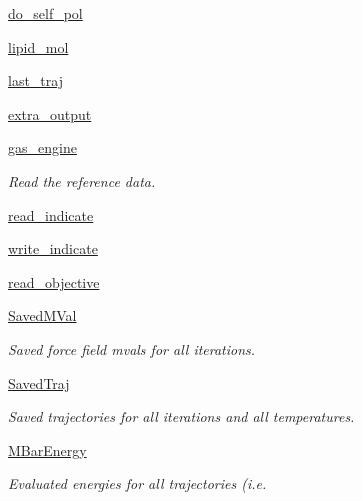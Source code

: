 \begin{DoxyCompactItemize}
\item 
\hyperlink{classforcebalance_1_1lipid_1_1Lipid_a20b017fb691f904bd18bd7d9ff1c91fc}{do\-\_\-self\-\_\-pol}
\item 
\hyperlink{classforcebalance_1_1lipid_1_1Lipid_a1e5ac68a7b79b3481acb17ed86db8aa1}{lipid\-\_\-mol}
\item 
\hyperlink{classforcebalance_1_1lipid_1_1Lipid_aeb05bd9b9da9b19c57e40a9675409731}{last\-\_\-traj}
\item 
\hyperlink{classforcebalance_1_1lipid_1_1Lipid_aedfd8a447f46dc6c2072ad50f4537cf7}{extra\-\_\-output}
\item 
\hyperlink{classforcebalance_1_1lipid_1_1Lipid_ad64df596db06f1dbdf49e0acca65534f}{gas\-\_\-engine}
\begin{DoxyCompactList}\small\item\em Read the reference data. \end{DoxyCompactList}\item 
\hyperlink{classforcebalance_1_1lipid_1_1Lipid_af5dfb680e8dc79f92c8e882f72f15559}{read\-\_\-indicate}
\item 
\hyperlink{classforcebalance_1_1lipid_1_1Lipid_abd1d6916a71c0529ad86dffd5d1f033c}{write\-\_\-indicate}
\item 
\hyperlink{classforcebalance_1_1lipid_1_1Lipid_a0edba63f8f5fbc3f8c51df153a886db9}{read\-\_\-objective}
\item 
\hyperlink{classforcebalance_1_1lipid_1_1Lipid_a07e86c96c0045df320ffde881315fec3}{Saved\-M\-Val}
\begin{DoxyCompactList}\small\item\em Saved force field mvals for all iterations. \end{DoxyCompactList}\item 
\hyperlink{classforcebalance_1_1lipid_1_1Lipid_a49bef67b40e46c5df608c00d2519b111}{Saved\-Traj}
\begin{DoxyCompactList}\small\item\em Saved trajectories for all iterations and all temperatures. \end{DoxyCompactList}\item 
\hyperlink{classforcebalance_1_1lipid_1_1Lipid_aa41ccbc13f7ca3f0700b825a9e51a24a}{M\-Bar\-Energy}
\begin{DoxyCompactList}\small\item\em Evaluated energies for all trajectories (i.\-e. \end{DoxyCompactList}\item 

\end{DoxyCompactItemize}

